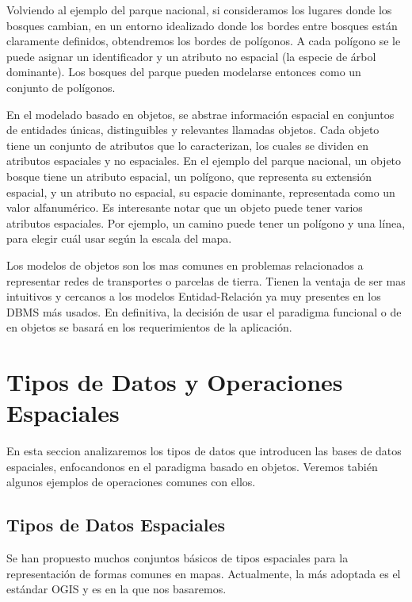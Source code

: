 Volviendo al ejemplo del parque nacional, si consideramos los lugares donde los bosques cambian,
en un entorno idealizado donde los bordes entre bosques están claramente definidos, obtendremos los bordes de polígonos.
A cada polígono se le puede asignar un identificador y un atributo no espacial (la especie de árbol dominante).
Los bosques del parque pueden modelarse entonces como un conjunto de polígonos.

En el modelado basado en objetos, se abstrae información espacial en conjuntos de
entidades únicas, distinguibles y relevantes llamadas objetos.
Cada objeto tiene un conjunto de atributos que lo caracterizan, los cuales se dividen en atributos espaciales y no espaciales.
En el ejemplo del parque nacional, un objeto bosque tiene un atributo espacial, un polígono, que representa su extensión espacial,
y un atributo no espacial, su espacie dominante, representada como un valor alfanumérico.
Es interesante notar que un objeto puede tener varios atributos espaciales.
Por ejemplo, un camino puede tener un polígono y una línea, para elegir cuál usar según la escala del mapa.

Los modelos de objetos son los mas comunes en problemas relacionados a representar redes de transportes o parcelas de tierra.
Tienen la ventaja de ser mas intuitivos y cercanos a los modelos Entidad-Relación ya muy presentes en los DBMS más usados.
En definitiva, la decisión de usar el paradigma funcional o de en objetos se basará en los requerimientos de la aplicación.

\section{Tipos de Datos y Operaciones Espaciales} \label{sec:s:sdt}

En esta seccion analizaremos los tipos de datos que introducen las bases de datos espaciales, enfocandonos en el paradigma basado en objetos. Veremos tabién algunos ejemplos de operaciones comunes con ellos.

\subsection{Tipos de Datos Espaciales}

Se han propuesto muchos conjuntos básicos de tipos espaciales para la representación de formas comunes en mapas. Actualmente, la más adoptada es el estándar OGIS\textsuperscript{\cite{99opengis}} y es en la que nos basaremos.

